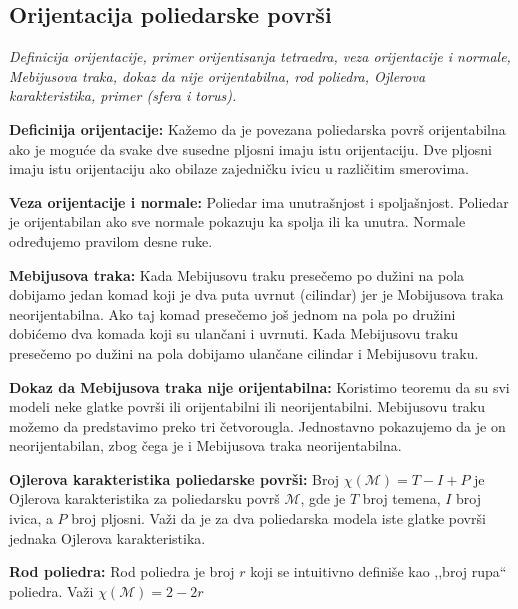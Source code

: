 \documentclass[12pt]{article}
\begin{document}
\subsection{Orijentacija poliedarske površi}
\textit{Definicija orijentacije, primer orijentisanja tetraedra, veza
    orijentacije i normale, Mebijusova traka, dokaz da nije orijentabilna, rod
    poliedra, Ojlerova karakteristika, primer (sfera i torus).}
\par
\vspace*{1cm}

\textbf{Deficinija orijentacije:} Kažemo da je povezana poliedarska površ
orijentabilna ako je moguće da svake dve susedne pljosni imaju istu
orijentaciju. Dve pljosni imaju istu orijentaciju ako obilaze zajedničku ivicu
u različitim smerovima.
\par

\textbf{Veza orijentacije i normale:} Poliedar ima unutrašnjost i spoljašnjost.
Poliedar je orijentabilan ako sve normale pokazuju ka spolja ili ka unutra.
Normale određujemo pravilom desne ruke.
\par

\textbf{Mebijusova traka:} Kada Mebijusovu traku presečemo po dužini na pola
dobijamo jedan komad koji je dva puta uvrnut (cilindar) jer je Mobijusova traka
neorijentabilna. Ako taj komad presečemo još jednom na pola po družini dobićemo
dva komada koji su ulančani i uvrnuti. Kada Mebijusovu traku presečemo po
dužini na pola dobijamo ulančane cilindar i Mebijusovu traku.
\par

\textbf{Dokaz da Mebijusova traka nije orijentabilna:} Koristimo teoremu da su
svi modeli neke glatke površi ili orijentabilni ili neorijentabilni. Mebijusovu
traku možemo da predstavimo preko tri četvorougla. Jednostavno pokazujemo da je
on neorijentabilan, zbog čega je i Mebijusova traka neorijentabilna.
\par

\textbf{Ojlerova karakteristika poliedarske površi:} Broj
$\chi(\mathcal{M})=T-I+P$ je Ojlerova karakteristika za poliedarsku površ
$\mathcal{M}$, gde je $T$ broj temena, $I$ broj ivica, a $P$ broj pljosni. Važi
da je za dva poliedarska modela iste glatke površi jednaka Ojlerova
karakteristika.
\par

\textbf{Rod poliedra:} Rod poliedra je broj $r$ koji se intuitivno definiše kao
,,broj rupa`` poliedra. Važi $\chi(\mathcal{M})=2-2r$
\par
\end{document}
